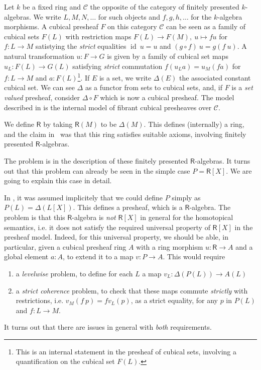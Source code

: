 \documentclass[10pt,a4paper]{article}
\theoremstyle{definition}
\theoremstyle{remark}
\newcommand{\CC}{\mathcal{C}}
\DeclareMathOperator\id{id}
\newcommand\RR{\mathsf{R}}
\begin{document}
Let $k$ be a fixed ring and $\CC$ the opposite of the category
of finitely presented $k$-algebras. 
We write $L,M,N,\dots$ for such objects and $f,g,h,\dots$ for the $k$-algebra morphisms.
A cubical presheaf $F$ on this category $\CC$
can be seen as a family of cubical sets $F(L)$ with restriction maps $F(L)\rightarrow F(M),~u\mapsto fu$ for $f:L\rightarrow M$ satistying the
{\em strict} equalities $\id~u= u$ and $(g\circ f)~u = g(f~u)$. A natural transformation $u:F\rightarrow G$ is given by a family of
cubical set maps $u_L:F(L)\rightarrow G(L)$ satisfying {\em strict} commutation $f(u_La) = u_M(f a)$ for $f:L\rightarrow M$ and $a:F(L)$\footnote{This is an internal statement in the presheaf of cubical sets, involving a quantification on the cubical set $F(L)$.}.
If $E$ is a set, we write $\Delta(E)$ the associated constant cubical set.
We can see $\Delta$ as a functor from sets to cubical sets, and, if $F$ is a {\em set valued} presheaf, consider $\Delta\circ F$ which is now
a cubical presheaf.
The model described in \cite{draft} is the internal model of fibrant cubical presheaves \cite{draft,CRS21} over $\CC$.

We define $\RR$ by taking $\RR(M)$ to be $\Delta(M)$. This defines (internally) a ring, and the claim in~\cite{draft}
was that this ring satisfies suitable axioms, involving finitely presented $\RR$-algebras.

The problem is in the description of these
finitely presented $\RR$-algebras. It turns out that this problem can already be seen in the simple case $P = \RR[X]$.
We are  going to explain this case in detail.

In \cite{draft}, it was assumed implicitely that we could define $P$ simply as $P(L) = \Delta (L[X])$. This defines a presheaf,
which is a $\RR$-algebra. 
The problem is that this
$\RR$-algebra is {\em not} $\RR[X]$ in general for the homotopical semantics, i.e.
it does not satisfy the required universal property of $\RR[X]$ in the presheaf model.
Indeed, for this universal property, we should be able, in particular, given a cubical presheaf ring
$A$ with a ring morphism $u:\RR\rightarrow A$ and a global element $a:A$, to extend
it to a map $v:P\rightarrow A$. This would require
\begin{enumerate}
\item a {\em levelwise} problem, to define for each $L$ a map $v_L:\Delta (P(L))\rightarrow A(L)$
\item a {\em strict coherence} problem, to check that these maps commute {\em strictly} with restrictions, i.e. $v_M(f~p) = f v_L(p)$, as a
  strict equality, for any $p$ in $P(L)$ and $f:L\rightarrow M$.
\end{enumerate}
It turns out that there are issues in general with {\em both} requirements.
\end{document}
